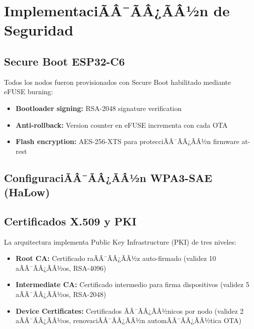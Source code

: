 \section{ImplementaciÃÂ¯ÃÂ¿ÃÂ½n de Seguridad}
\label{sec:impl-seguridad}

\subsection{Secure Boot ESP32-C6}

Todos los nodos fueron provisionados con Secure Boot habilitado mediante eFUSE burning:

\begin{itemize}
    \item \textbf{Bootloader signing:} RSA-2048 signature verification
    \item \textbf{Anti-rollback:} Version counter en eFUSE incrementa con cada OTA
    \item \textbf{Flash encryption:} AES-256-XTS para protecciÃÂ¯ÃÂ¿ÃÂ½n firmware at-rest
\end{itemize}


\subsection{ConfiguraciÃÂ¯ÃÂ¿ÃÂ½n WPA3-SAE (HaLow)}


\subsection{Certificados X.509 y PKI}

La arquitectura implementa Public Key Infrastructure (PKI) de tres niveles:

\begin{itemize}
    \item \textbf{Root CA:} Certificado raÃÂ¯ÃÂ¿ÃÂ½z auto-firmado (validez 10 aÃÂ¯ÃÂ¿ÃÂ½os, RSA-4096)
    \item \textbf{Intermediate CA:} Certificado intermedio para firma dispositivos (validez 5 aÃÂ¯ÃÂ¿ÃÂ½os, RSA-2048)
    \item \textbf{Device Certificates:} Certificados ÃÂ¯ÃÂ¿ÃÂ½nicos por nodo (validez 2 aÃÂ¯ÃÂ¿ÃÂ½os, renovaciÃÂ¯ÃÂ¿ÃÂ½n automÃÂ¯ÃÂ¿ÃÂ½tica OTA)
\end{itemize}

